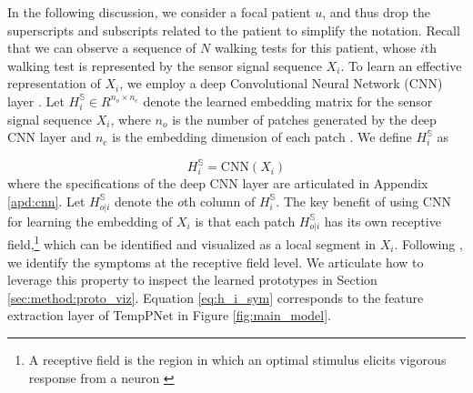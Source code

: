 \documentclass[mnsc]{informs3b} %
\begin{document}
In the following discussion, we consider a focal patient $u$, and thus drop the superscripts and subscripts related to the patient to simplify the notation. Recall that we can observe a sequence of $N$ walking tests for this patient, whose $i$th walking test is represented by the sensor signal sequence $X_i$. To learn an effective representation of $X_i$, we employ a deep Convolutional Neural Network (CNN) layer \citep{goodfellow_deep_2016, zhang_deep_2020}. Let $H_i^{\mathbb{S}}\in R^{n_o \times n_e}$ denote the learned embedding matrix for the sensor signal sequence $X_i$, where $n_o$ is the number of patches generated by the deep CNN layer and $n_e$ is the embedding dimension of each patch \citep{chen_this_2019}. We define $H_i^{\mathbb{S}}$ as

\begin{equation}
\label{eq:h_i_sym}
H_{i}^{\mathbb{S}} = \text{CNN}(X_{i})
\end{equation}
where the specifications of the deep CNN layer are articulated in Appendix \ref{apd:cnn}. Let $H_{o|i}^{\mathbb{S}}$ denote the $o$th column of $H_{i}^{\mathbb{S}}$. 
The key benefit of using CNN for learning the embedding of $X_i$ is that each patch $H_{o|i}^{\mathbb{S}}$ has its own receptive field,\footnote{A receptive field is the region in which an optimal stimulus elicits vigorous response from a neuron \citep{goodfellow_deep_2016}} which can be identified and visualized as a local segment in $X_i$. Following \cite{chen_this_2019}, we identify the symptoms at the receptive field level.
We articulate how to leverage this property to inspect the learned prototypes in Section \ref{sec:method:proto_viz}.
Equation \ref{eq:h_i_sym} corresponds to the feature extraction layer of TempPNet in Figure \ref{fig:main_model}.
\end{document}
